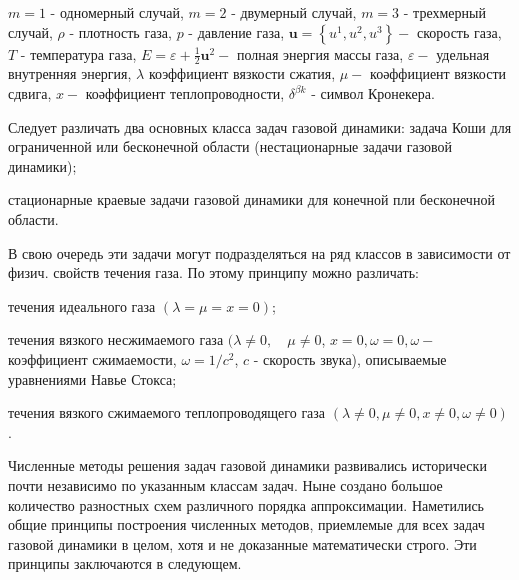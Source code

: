 \documentclass[10pt]{article}
\begin{document}
$m=1$ - одномерный случай, $m=2$ - двумерный случай, $m=3$ - трехмерный случай, $\rho$ - плотность газа, $p$ - давление газа, $\boldsymbol{u}=\left\{u^{1}, u^{2}, u^{3}\right\}-$ скорость газа, $T$ - температура газа, $E=\varepsilon+\frac{1}{2} \boldsymbol{u}^{2}-$ полная энергия массы газа, $\varepsilon-$ удельная внутренняя энергия, $\lambda$ коэффициент вязкости сжатия, $\mu-$ коәффициент вязкости сдвига, $x-$ коәффициент теплопроводности, $\delta^{\beta k}$ - символ Кронекера.



Следует различать два основных класса задач газовой динамики: задача Коши для ограниченной или бесконечной области (нестационарные задачи газовой динамики);



стационарные краевые задачи газовой динамики для конечной пли бесконечной области.



В свою очередь эти задачи могут подразделяться на ряд классов в зависимости от физич. свойств течения газа. По этому принципу можно различать:



течения идеального газа $(\lambda=\mu=x=0)$;



течения вязкого несжимаемого газа $(\lambda \neq 0, \quad \mu \neq 0$, $x=0, \omega=0, \omega-$ коэффициент сжимаемости, $\omega=1 / c^{2}$, $c$ - скорость звука), описываемые уравнениями Навье Стокса;



течения вязкого сжимаемого теплопроводящего газа $(\lambda \neq 0, \mu \neq 0, x \neq 0, \omega \neq 0)$.



Численные методы решения задач газовой динамики развивались исторически почти независимо по указанным классам задач. Ныне создано большое количество разностных схем различного порядка аппроксимации. Наметились общие принципы построения численных методов, приемлемые для всех задач газовой динамики в целом, хотя и не доказанные математически строго. Эти принципы заключаются в следующем.
\end{document}
